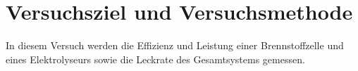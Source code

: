 \documentclass[a4paper,12pt,bibtotocnumbered]{scrartcl}
\numberwithin{equation}{section} %
\begin{document}
\renewcommand{\thepage}{\arabic{page}}
\setcounter{page}{1}



\section[Versuchsziel]{Versuchsziel und Versuchsmethode}
In diesem Versuch werden die Effizienz und Leistung einer Brennstoffzelle und eines Elektrolyseurs sowie die Leckrate des Gesamtsystems gemessen.
\end{document}
